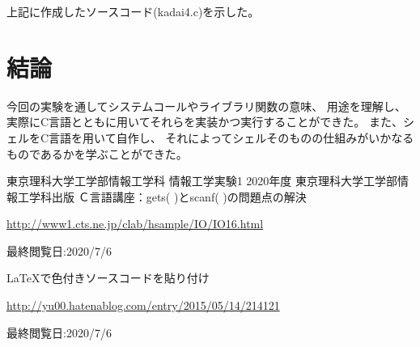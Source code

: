 \documentclass[12pt]{jarticle}
\begin{document}
上記に作成したソースコード(kadai4.c)を示した。

\section{結論}
今回の実験を通してシステムコールやライブラリ関数の意味、
用途を理解し、実際にC言語とともに用いてそれらを実装かつ実行することができた。
また、シェルをC言語を用いて自作し、
それによってシェルそのものの仕組みがいかなるものであるかを学ぶことができた。

\begin{thebibliography}{99}
    \label{sannkoubunnkenn_chapter}
    東京理科大学工学部情報工学科 情報工学実験1 2020年度
    東京理科大学工学部情報工学科出版
    Ｃ言語講座：gets( )とscanf( )の問題点の解決

    \url{http://www1.cts.ne.jp/clab/hsample/IO/IO16.html}

    最終閲覧日:2020/7/6

    LaTeXで色付きソースコードを貼り付け

    \url{http://yu00.hatenablog.com/entry/2015/05/14/214121}

    最終閲覧日:2020/7/6

\end{thebibliography}

\clearpage
\appendix
\end{document}
